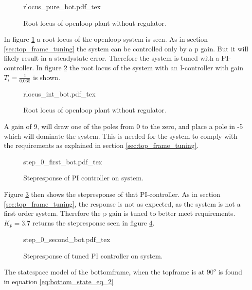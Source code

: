 \documentclass[../../../Main]{subfiles}
\begin{document}
\begin{figure}[H]
\centering
\def\svgwidth{\textwidth}
{rlocus_pure_bot.pdf_tex}
\caption{Root locus of openloop plant without regulator.}
\label{fig:rlocus_pure_bot}
\end{figure}

In figure \ref{fig:rlocus_pure_bot} a root locus of the openloop system is seen. As in section \ref{sec:top_frame_tuning} the system can be controlled only by a p gain. But it will likely result in a steadystate error. Therefore the system is tuned with a PI-controller. In figure \ref{fig:rlocus_int_bot} the root locus of the system with an I-controller with gain $T_i = \frac{1}{0.035}$ is shown.

\begin{figure}[H]
\centering
\def\svgwidth{\textwidth}
{rlocus_int_bot.pdf_tex}
\caption{Root locus of openloop plant without regulator.}
\label{fig:rlocus_int_bot}
\end{figure}

A gain of 9, will draw one of the poles from $0$ to the zero, and place a pole in -5 which will dominate the system. This is needed for the system to comply with the requirements as explained in section \ref{sec:top_frame_tuning}.

\begin{figure}[H]
\centering
\def\svgwidth{\textwidth}
{step_0_first_bot.pdf_tex}
\caption{Stepresponse of PI controller on system.}
\label{fig:step_0_first_bot}
\end{figure}

Figure \ref{fig:step_0_first_bot} then shows the stepresponse of that PI-controller.
As in section \ref{sec:top_frame_tuning}, the response is not as expected, as the system is not a first order system. Therefore the p gain is tuned to better meet requirements. $K_p = 3.7$ returns the stepresponse seen in figure \ref{fig:step_0_second_bot}.

\begin{figure}[H]
\centering
\def\svgwidth{\textwidth}
{step_0_second_bot.pdf_tex}
\caption{Stepresponse of tuned PI controller on system.}
\label{fig:step_0_second_bot}
\end{figure}


The statespace model of the bottomframe, when the topframe is at $90^o$  is found in equation \ref{eq:bottom_state_eq_2}
\end{document}
